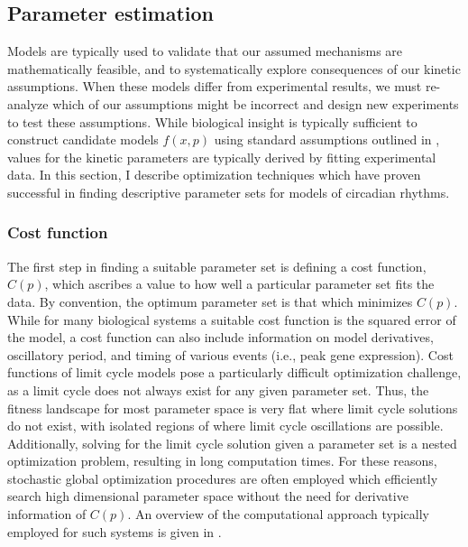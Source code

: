 \subsection{Parameter estimation}

Models are typically used to validate that our assumed mechanisms are mathematically feasible, and to systematically explore consequences of our kinetic assumptions.
When these models differ from experimental results, we must re-analyze which of our assumptions might be incorrect and design new experiments to test these assumptions.
While biological insight is typically sufficient to construct candidate models $f(x, p)$ using standard assumptions outlined in , values for the kinetic parameters are typically derived by fitting experimental data.
In this section, I describe optimization techniques which have proven successful in finding descriptive parameter sets for models of circadian rhythms.

\subsubsection{Cost function}

The first step in finding a suitable parameter set is defining a cost function, $C(p)$, which ascribes a value to how well a particular parameter set fits the data.
By convention, the optimum parameter set is that which minimizes $C(p)$.
While for many biological systems a suitable cost function is the squared error of the model, a cost function can also include information on model derivatives, oscillatory period, and timing of various events (i.e., peak gene expression).
Cost functions of limit cycle models pose a particularly difficult optimization challenge, as a limit cycle does not always exist for any given parameter set.
Thus, the fitness landscape for most parameter space is very flat where limit cycle solutions do not exist, with isolated regions of  where limit cycle oscillations are possible.
Additionally, solving for the limit cycle solution given a parameter set is a nested optimization problem, resulting in long computation times.
For these reasons, stochastic global optimization procedures are often employed which efficiently search high dimensional parameter space without the need for derivative information of $C(p)$.
An overview of the computational approach typically employed for such systems is given in .


